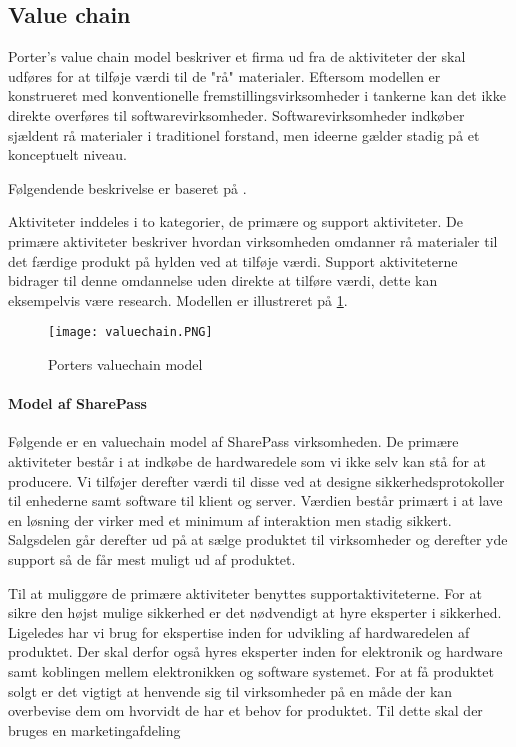 \subsection{Value chain}


Porter's value chain model beskriver et firma ud fra de aktiviteter der skal udføres for at tilføje værdi til de "rå" materialer.
Eftersom modellen er konstrueret med konventionelle fremstillingsvirksomheder i tankerne kan det ikke direkte overføres til softwarevirksomheder.
Softwarevirksomheder indkøber sjældent rå materialer i traditionel forstand, men ideerne gælder stadig på et konceptuelt niveau.

Følgendende beskrivelse er baseret på \citet[p.~12]{rose2012software}.

Aktiviteter inddeles i to kategorier, de primære og support aktiviteter.
De primære aktiviteter beskriver hvordan virksomheden omdanner rå materialer til det færdige produkt på hylden ved at tilføje værdi.
Support aktiviteterne bidrager til denne omdannelse uden direkte at tilføre værdi, dette kan eksempelvis være research.
Modellen er illustreret på  \cref{valuechain}.

\begin{figure}
	\texttt{[image: valuechain.PNG]}
	\caption{Porters valuechain model}
	\label{valuechain}
\end{figure}

\paragraph{Model af SharePass}
Følgende er en valuechain model af SharePass virksomheden.
De primære aktiviteter består i at indkøbe de hardwaredele som vi ikke selv kan stå for at producere.
Vi tilføjer derefter værdi til disse ved at designe sikkerhedsprotokoller til enhederne samt software til klient og server.
Værdien består primært i at lave en løsning der virker med et minimum af interaktion men stadig sikkert.
Salgsdelen går derefter ud på at sælge produktet til virksomheder og derefter yde support så de får mest muligt ud af produktet.

Til at muliggøre de primære aktiviteter benyttes supportaktiviteterne.
For at sikre den højst mulige sikkerhed er det nødvendigt at hyre eksperter i sikkerhed.
Ligeledes har vi brug for ekspertise inden for udvikling af hardwaredelen af produktet.
Der skal derfor også hyres eksperter inden for elektronik og hardware samt koblingen mellem elektronikken og software systemet.
For at få produktet solgt er det vigtigt at henvende sig til virksomheder på en måde der kan overbevise dem om hvorvidt de har et behov for produktet.
Til dette skal der bruges en marketingafdeling

